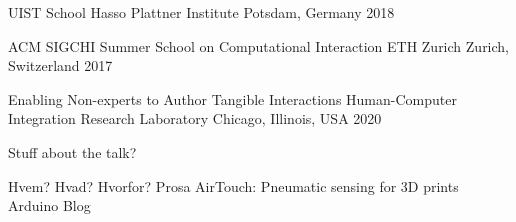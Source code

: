 
    \begin{cventries}
      \cventry
        {UIST School}
        {Hasso Plattner Institute}
        {Potsdam, Germany}
        {2018}
        {}

      \cventry
        {ACM SIGCHI Summer School on Computational Interaction}
        {ETH Zurich}
        {Zurich, Switzerland}
        {2017}
        {}
    \end{cventries}

    \begin{cventries}
      \cventry
        {Enabling Non-experts to Author Tangible Interactions}
        {Human-Computer Integration Research Laboratory}
        {Chicago, Illinois, USA}
        {2020}
        {
          \begin{cvitems}
            \item{Stuff about the talk?}
          \end{cvitems}
          \vspace{1em}
        }
    \end{cventries}

    \begin{cventries}
      \cventry
        {Hvem? Hvad? Hvorfor?}
        {Prosa}
        {}
        {}
        {}
      \cventry
        {AirTouch: Pneumatic sensing for 3D prints}
        {Arduino Blog}
        {}
        {}
        {}
    \end{cventries}

